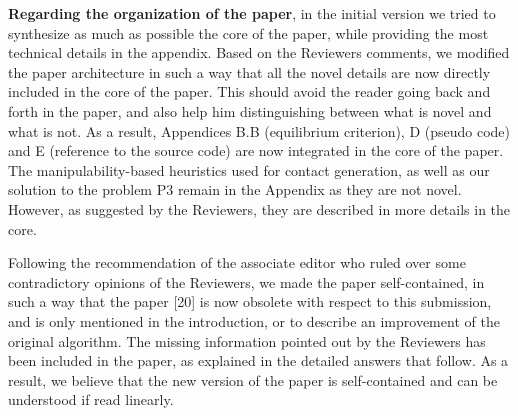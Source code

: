 \documentclass[a4paper]{article}
\begin{document}
\textbf{Regarding the organization of the paper}, in the initial version we tried to synthesize as much as possible
the core of the paper, while providing the most technical details in the appendix. Based on the Reviewers comments, we modified
the paper architecture in such a way that all the novel details are now directly included in the core of the paper. This should avoid the reader going back and forth
in the paper, and also help him distinguishing between what is novel and what is not. As a result,  Appendices B.B (equilibrium criterion), D (pseudo code) and E (reference to the source code) are now integrated in the core of the paper. The manipulability-based heuristics used for contact generation, as well as our solution to the problem P3 remain in the Appendix as they are not novel. However, as suggested by the Reviewers, they are described in more details in the core. 

Following the recommendation of the associate editor who ruled over some contradictory opinions of the Reviewers, we made the paper self-contained,
in such a way that the paper [20] is now obsolete with respect to this submission, and is only mentioned in the introduction, or to describe an improvement
of the original algorithm. The missing information pointed out by the Reviewers has been 
included in the paper, as explained in the detailed answers that follow. As a result, we believe that the new version of the paper is self-contained and can be understood if read linearly.\\

\end{document}
